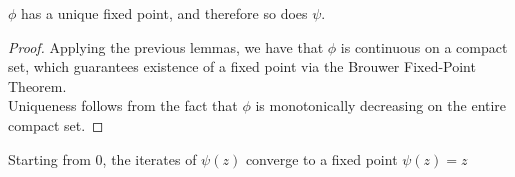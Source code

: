 \documentclass[12pt,leqno,letterpaper]{article}
\begin{document}
\begin{theorem}
$\phi$ has a unique fixed point, and therefore so does $\psi$.
\end{theorem}
\begin{proof}
Applying the previous lemmas, we have that $\phi$ is continuous on a compact set, which guarantees existence of a fixed point via the Brouwer Fixed-Point Theorem.\\
Uniqueness follows from the fact that $\phi$ is monotonically decreasing on the entire compact set.
\end{proof}

\iffalse
\begin{theorem}Starting from $0$, the iterates of $\psi(z)$ converge to a fixed point $\psi(z)=z$
\end{theorem}
\end{document}
